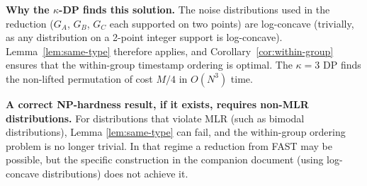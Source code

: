 \documentclass[11pt]{article}
\begin{document}
\textbf{Why the $\kappa$-DP finds this solution.}  The noise distributions used in
the reduction ($G_A$, $G_B$, $G_C$ each supported on two points) are log-concave
(trivially, as any distribution on a 2-point integer support is log-concave).
Lemma~\ref{lem:same-type} therefore applies, and Corollary~\ref{cor:within-group}
ensures that the within-group timestamp ordering is optimal.  The $\kappa = 3$ DP
finds the non-lifted permutation of cost $M/4$ in $O(N^3)$ time.

\textbf{A correct NP-hardness result, if it exists, requires non-MLR distributions.}
For distributions that violate MLR (such as bimodal distributions), Lemma
\ref{lem:same-type} can fail, and the within-group ordering problem is no longer
trivial.  In that regime a reduction from FAST may be possible, but the specific
construction in the companion document (using log-concave distributions) does not
achieve it.
\end{document}
